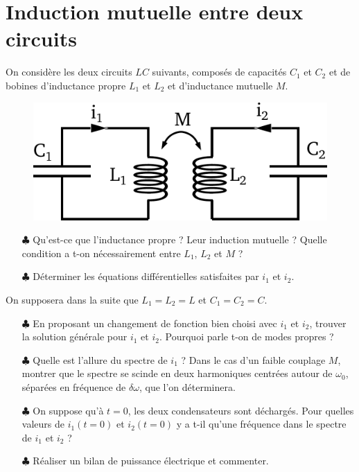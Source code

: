 \documentclass{report}
\begin{document}
\section*{Induction mutuelle entre deux circuits}

On considère les deux circuits $LC$ suivants, composés de capacités $C_1$ et $C_2$ et de bobines d'inductance propre $L_1$ et $L_2$ et d'inductance mutuelle $M$. 

\begin{figure}[h!]
\centering
		\includegraphics[scale=0.45]{induction_mutuelle.pdf}
\end{figure}

\begin{itemize}
	
	\item[$\clubsuit$] Qu'est-ce que l'inductance propre ? Leur induction mutuelle ? Quelle condition a t-on nécessairement entre $L_1$, $L_2$ et $M$ ?
	
	\item[$\clubsuit$] Déterminer les équations différentielles satisfaites par $i_1$ et $i_2$.
	
\end{itemize}

On supposera dans la suite que $L_1=L_2=L$ et $C_1=C_2=C$.

\begin{itemize}	
	
	\item[$\clubsuit$] En proposant un changement de fonction bien choisi avec $i_1$ et $i_2$, trouver la solution générale pour $i_1$ et $i_2$. Pourquoi parle t-on de modes propres ?
	
	\item[$\clubsuit$] Quelle est l'allure du spectre de $i_1$ ? Dans le cas d'un faible couplage $M$, montrer que le spectre se scinde en deux harmoniques centrées autour de $\omega_0$, séparées en fréquence de $\delta\omega$, que l'on déterminera.  
	
	\item[$\clubsuit$] On suppose qu'à $t=0$, les deux condensateurs sont déchargés. Pour quelles valeurs de $i_1(t=0)$ et $i_2(t=0)$ y a t-il qu'une fréquence dans le spectre de $i_1$ et $i_2$ ?
	
	\item[$\clubsuit$] Réaliser un bilan de puissance électrique et commenter. 
	
\end{itemize}
\end{document}
